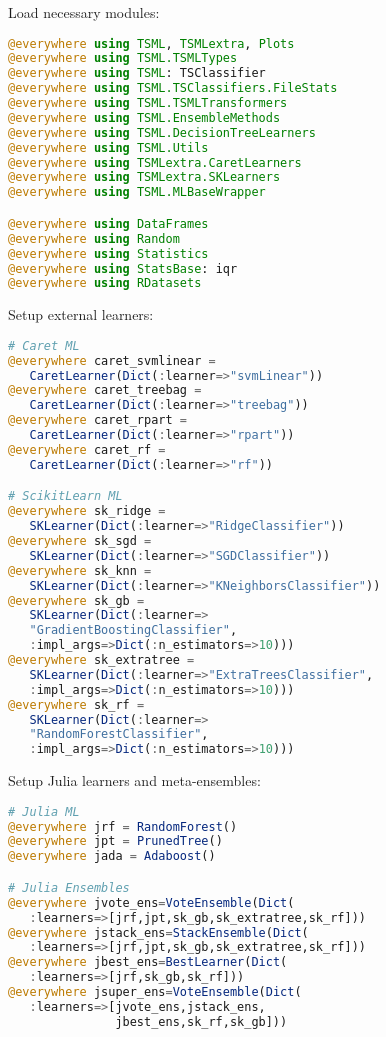 \documentclass{juliacon}
\begin{document}
\vskip 6pt

Load necessary modules:
\begin{lstlisting}[language = Julia]
@everywhere using TSML, TSMLextra, Plots
@everywhere using TSML.TSMLTypes
@everywhere using TSML: TSClassifier
@everywhere using TSML.TSClassifiers.FileStats
@everywhere using TSML.TSMLTransformers
@everywhere using TSML.EnsembleMethods
@everywhere using TSML.DecisionTreeLearners
@everywhere using TSML.Utils
@everywhere using TSMLextra.CaretLearners
@everywhere using TSMLextra.SKLearners
@everywhere using TSML.MLBaseWrapper

@everywhere using DataFrames
@everywhere using Random
@everywhere using Statistics
@everywhere using StatsBase: iqr
@everywhere using RDatasets
\end{lstlisting}

Setup external learners:
\begin{lstlisting}[language = Julia]
# Caret ML
@everywhere caret_svmlinear = 
   CaretLearner(Dict(:learner=>"svmLinear"))
@everywhere caret_treebag = 
   CaretLearner(Dict(:learner=>"treebag"))
@everywhere caret_rpart = 
   CaretLearner(Dict(:learner=>"rpart"))
@everywhere caret_rf = 
   CaretLearner(Dict(:learner=>"rf"))

# ScikitLearn ML
@everywhere sk_ridge = 
   SKLearner(Dict(:learner=>"RidgeClassifier"))
@everywhere sk_sgd = 
   SKLearner(Dict(:learner=>"SGDClassifier"))
@everywhere sk_knn = 
   SKLearner(Dict(:learner=>"KNeighborsClassifier"))
@everywhere sk_gb = 
   SKLearner(Dict(:learner=>
   "GradientBoostingClassifier",
   :impl_args=>Dict(:n_estimators=>10)))
@everywhere sk_extratree = 
   SKLearner(Dict(:learner=>"ExtraTreesClassifier",
   :impl_args=>Dict(:n_estimators=>10)))
@everywhere sk_rf = 
   SKLearner(Dict(:learner=>
   "RandomForestClassifier",
   :impl_args=>Dict(:n_estimators=>10)))
\end{lstlisting}

Setup Julia learners and meta-ensembles:
\begin{lstlisting}[language = Julia]
# Julia ML
@everywhere jrf = RandomForest()
@everywhere jpt = PrunedTree()
@everywhere jada = Adaboost()

# Julia Ensembles
@everywhere jvote_ens=VoteEnsemble(Dict(
   :learners=>[jrf,jpt,sk_gb,sk_extratree,sk_rf]))
@everywhere jstack_ens=StackEnsemble(Dict(
   :learners=>[jrf,jpt,sk_gb,sk_extratree,sk_rf]))
@everywhere jbest_ens=BestLearner(Dict(
   :learners=>[jrf,sk_gb,sk_rf]))
@everywhere jsuper_ens=VoteEnsemble(Dict(
   :learners=>[jvote_ens,jstack_ens,
               jbest_ens,sk_rf,sk_gb]))
\end{lstlisting}
\end{document}
